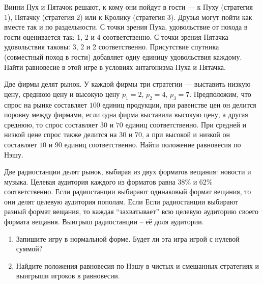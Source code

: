 \begin{exercise}
Винни Пух и Пятачок решают, к кому они пойдут в гости --- к Пуху
(стратегия 1), Пятачку (стратегия 2) или к Кролику (стратегия 3).
Друзья могут пойти как вместе так и по раздельности. С точки
зрения Пуха, удовольствие от похода в гости оценивается так: 1, 2
и 4 соответственно. С точки зрения Пятачка удовольствия таковы: 3,
2 и 2 соответственно. Присутствие спутника (совместный поход в
гости) добавляет одну единицу удовольствия каждому. Найти
равновесие в этой игре в условиях антагонизма Пуха и Пятачка.
\end{exercise}

\begin{exercise}
Две фирмы делят рынок. У каждой фирмы три стратегии --- выставить
низкую цену, среднюю цену и высокую цену $p_1=2$, $p_2=4$,
$p_3=7$. Предположим, что спрос на рынке составляет $100$ единиц
продукции, при равенстве цен он делится поровну между фирмами,
если одна фирма выставила высокую цену, а другая среднюю, то спрос
составляет $30$ и $70$ единиц соответственно. При средней и низкой
цене спрос также делится на $30$ и $70$, а при высокой и низкой
он составляет $10$ и $90$ единиц соответственно. Найти положение
равновесия по Нэшу.
\end{exercise}

\begin{exercise}
Две радиостанции делят рынок, выбирая из двух форматов вещания: новости и музыка.
Целевая аудитория каждого из форматов равна 38\% и 62\% соответственно. Если радиостанции
выбирают одинаковый формат вещания, то они делят целевую аудитория пополам.
Если Если радиостанции выбирают разный формат вещания, то каждая ``захватывает''
всю целевую аудиторию своего формата вещания. Выигрыш радиостанции -- её доля аудитории.
\begin{enumerate}
	\item Запишите игру в нормальной форме. 
	Будет ли эта игра игрой с нулевой суммой? %
	\item Найдите положения равновесия по Нэшу в чистых и смешанных стратегиях
	и выигрыши игроков в равновесии.
\end{enumerate}
\end{exercise}



